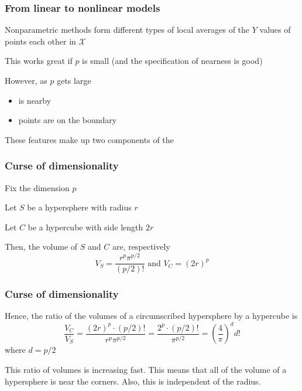 \documentclass[12pt]{beamer}
\begin{document}
\begin{frame}[fragile]
\frametitle{From linear to nonlinear models}
Nonparametric methods form different types of local averages of the $Y$ values of points  each other in $\mathcal{X}$


\vsp
This works great if $p$ is small (and the specification of nearness is good)

\vsp
However, as $p$ gets large
\begin{itemize}
\item {} is nearby
\item {} points are on the boundary

\end{itemize}
These features make up two components of the 


\end{frame}

\begin{frame}[fragile]
\frametitle{Curse of dimensionality}
Fix the dimension $p$


\vsp
Let $S$ be a hypersphere with radius $r$

\vsp
Let $C$ be a hypercube with side length $2r$

\vsp
Then, the volume of $S$ and $C$ are, respectively
\[
V_S = \frac{r^{p}\pi^{p/2}}{(p/2)!} \textrm{ and } V_C = (2r)^p
\]
\end{frame}

\begin{frame}[fragile]
\frametitle{Curse of dimensionality}
Hence, the ratio of the volumes of a circumscribed hypersphere by a hypercube is
\[
\frac{V_C}{V_S} =  \frac{(2r)^p\cdot (p/2)!}{r^{p}\pi^{p/2}} = \frac{2^p\cdot (p/2)!}{\pi^{p/2}}  = \left(\frac{4}{\pi}\right)^d d!
\]
where $d = p/2$

\vsp
{} This ratio of volumes is increasing  fast.  This means that all of the volume
of a hypersphere is near the corners.  Also, this is independent of the radius.
\end{frame}
\end{document}
